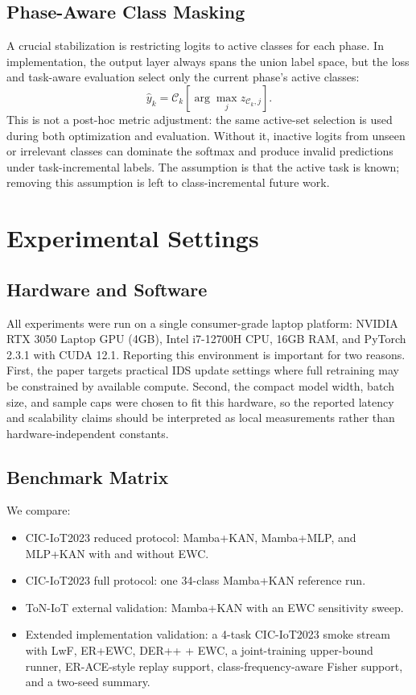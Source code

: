 \documentclass[a4paper,fleqn]{cas-dc}
\begin{document}
\subsection{Phase-Aware Class Masking}
A crucial stabilization is restricting logits to active classes for each phase. In implementation, the output layer always spans the union label space, but the loss and task-aware evaluation select only the current phase's active classes:
\begin{equation}
\hat{y}_k=\mathcal{C}_k\left[\arg\max_j z_{\mathcal{C}_k,j}\right].
\end{equation}
This is not a post-hoc metric adjustment: the same active-set selection is used during both optimization and evaluation. Without it, inactive logits from unseen or irrelevant classes can dominate the softmax and produce invalid predictions under task-incremental labels. The assumption is that the active task is known; removing this assumption is left to class-incremental future work.

\section{Experimental Settings}
\subsection{Hardware and Software}
All experiments were run on a single consumer-grade laptop platform: NVIDIA RTX 3050 Laptop GPU (4GB), Intel i7-12700H CPU, 16GB RAM, and PyTorch 2.3.1 with CUDA 12.1. Reporting this environment is important for two reasons. First, the paper targets practical IDS update settings where full retraining may be constrained by available compute. Second, the compact model width, batch size, and sample caps were chosen to fit this hardware, so the reported latency and scalability claims should be interpreted as local measurements rather than hardware-independent constants.

\subsection{Benchmark Matrix}
We compare:
\begin{itemize}
\item CIC-IoT2023 reduced protocol: Mamba+KAN, Mamba+MLP, and MLP+KAN with and without EWC.
\item CIC-IoT2023 full protocol: one 34-class Mamba+KAN reference run.
\item ToN-IoT external validation: Mamba+KAN with an EWC sensitivity sweep.
\item Extended implementation validation: a 4-task CIC-IoT2023 smoke stream with LwF, ER+EWC, DER++ + EWC, a joint-training upper-bound runner, ER-ACE-style replay support, class-frequency-aware Fisher support, and a two-seed summary.
\end{itemize}
\end{document}
